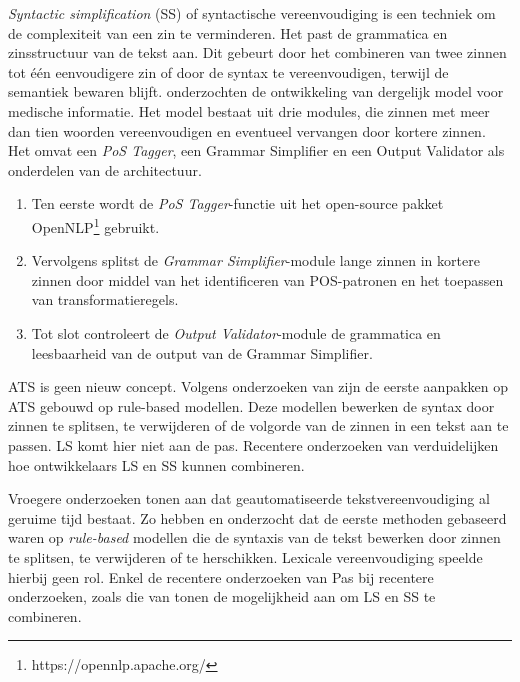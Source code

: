 \textit{Syntactic simplification} (SS) of syntactische vereenvoudiging is een techniek om de complexiteit van een zin te verminderen. Het past de grammatica en zinsstructuur van de tekst aan. Dit gebeurt door het combineren van twee zinnen tot één eenvoudigere zin of door de syntax te vereenvoudigen, terwijl de semantiek bewaren blijft. \textcite{Kandula2010} onderzochten de ontwikkeling van dergelijk model voor medische informatie. Het model bestaat uit drie modules, die zinnen met meer dan tien woorden vereenvoudigen en eventueel vervangen door kortere zinnen. Het omvat een \textit{PoS Tagger}, een Grammar Simplifier en een Output Validator als onderdelen van de architectuur.

\begin{enumerate}
	\item Ten eerste wordt de \textit{PoS Tagger}-functie uit het open-source pakket OpenNLP\footnote{https://opennlp.apache.org/} gebruikt.
	\item Vervolgens splitst de \textit{Grammar Simplifier}-module lange zinnen in kortere zinnen door middel van het identificeren van POS-patronen en het toepassen van transformatieregels.
	\item Tot slot controleert de \textit{Output Validator}-module de grammatica en leesbaarheid van de output van de Grammar Simplifier.
\end{enumerate}  

ATS is geen nieuw concept. Volgens onderzoeken van \textcite{Canning2000, Siddharthan2006} zijn de eerste aanpakken op ATS gebouwd op rule-based modellen. Deze modellen bewerken de syntax door zinnen te splitsen, te verwijderen of de volgorde van de zinnen in een tekst aan te passen. LS komt hier niet aan de pas. Recentere onderzoeken van \textcite{Coster2011, Bulte2018} verduidelijken hoe ontwikkelaars LS en SS kunnen combineren.

\medspace

Vroegere onderzoeken tonen aan dat geautomatiseerde tekstvereenvoudiging al geruime tijd bestaat. Zo hebben \textcite{Canning2000} en \textcite{Siddharthan2006} onderzocht dat de eerste methoden gebaseerd waren op \textit{rule-based} modellen die de syntaxis van de tekst bewerken door zinnen te splitsen, te verwijderen of te herschikken. Lexicale vereenvoudiging speelde hierbij geen rol. Enkel de recentere onderzoeken van  Pas bij recentere onderzoeken, zoals die van \textcite{Coster2011, Bulte2018} tonen de mogelijkheid aan om LS en SS te combineren.

\medspace

